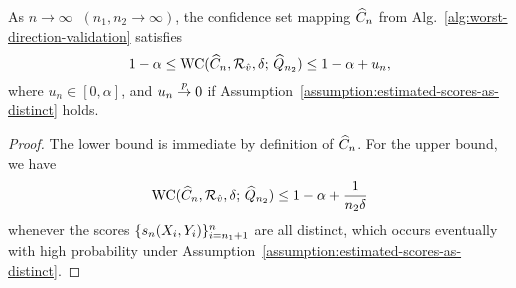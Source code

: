 \begin{lemma}
  \label{lem:consistency-of-empirical-worst-coverage-for-alpha}
  As $n \to \infty \; \; (n_1,n_2 \to \infty)$, the confidence set mapping
  $\widehat{C}_n$ from Alg.~\ref{alg:worst-direction-validation} satisfies
  \begin{equation*}
    1- \alpha \le \textup{WC}( \widehat{C}_n, \mathcal{R}_{\hat v}, \delta; \, \widehat{Q}_{n_2})
    \le 1 - \alpha + u_n,
  \end{equation*}
  where $u_n \in [0,\alpha]$, and $u_n \stackrel{p}{\rightarrow} 0$ if
  Assumption~\ref{assumption:estimated-scores-as-distinct} holds.
\end{lemma}
\begin{proof}
  The lower bound is immediate by definition of $\widehat{C}_n$.
  For the upper bound, we have
  \begin{equation*}
    \textup{WC}( \widehat{C}_n, \mathcal{R}_{\hat v}, \delta; \, \widehat{Q}_{n_2}) \le 1- \alpha + \frac{1}{n_2 \delta}
  \end{equation*}
  whenever the scores $\{ s_n(X_i,Y_i) \}_{i=n_1+1}^n$ are all distinct, which occurs eventually with high probability under Assumption~\ref{assumption:estimated-scores-as-distinct}.
\end{proof}

